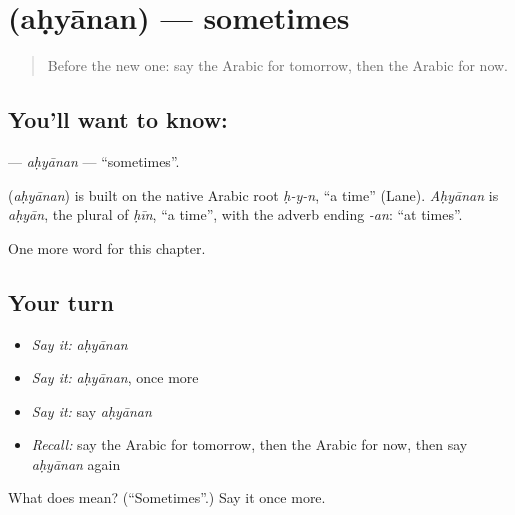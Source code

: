 \section[\texorpdfstring{\ar{أحيانا} (aḥyānan)}{أحيانا (aḥyānan)}]{ (aḥyānan) — sometimes}

\label{lesson:AR-C87-ahyanan}



\begin{quote}
Before the new one: say the Arabic for tomorrow, then the Arabic for now.
\end{quote}

\subsection*{You'll want to know: }
\textbf{} — \emph{aḥyānan} — \textquotedblleft{}sometimes\textquotedblright{}.

\begin{cousinweb}
\textbf{} (\emph{aḥyānan}) is built on the native Arabic root \emph{ḥ-y-n}, \textquotedblleft{}a time\textquotedblright{} (Lane). \emph{Aḥyānan} is \emph{aḥyān}, the plural of \emph{ḥīn}, \textquotedblleft{}a time\textquotedblright{}, with the adverb ending \emph{-an}: \textquotedblleft{}at times\textquotedblright{}.
\end{cousinweb}

\begin{grammarlens}[title={What you've built}]
One more word for this chapter.
\end{grammarlens}

\subsection*{Your turn}
\begin{itemize}
\raggedright
  \item \emph{Say it:} \emph{aḥyānan}
  \item \emph{Say it:} \emph{aḥyānan}, once more
  \item \emph{Say it:} say \emph{aḥyānan}
  \item \emph{Recall:} say the Arabic for tomorrow, then the Arabic for now, then say \emph{aḥyānan} again
\end{itemize}

\begin{tcolorbox}[breakable,colback=teal!4,colframe=teal!35!black,title={Before you move on}]
What does  mean? (\textquotedblleft{}Sometimes\textquotedblright{}.) Say it once more.
\end{tcolorbox}
